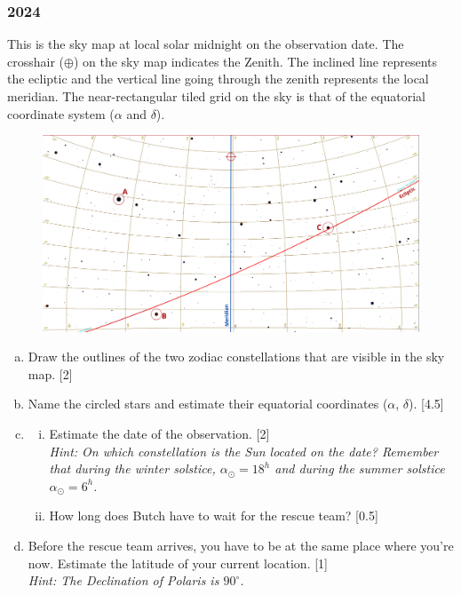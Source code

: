 \documentclass[a4paper,12pt]{extarticle}
\begin{document}
\subsubsection{2024}

This is the sky map at local solar midnight on the observation date. The crosshair ($\oplus$) on the sky map indicates the Zenith. The inclined line represents the ecliptic and the vertical line going through the zenith represents the local meridian. The near-rectangular tiled grid on the sky is that of the equatorial coordinate system ($\alpha$ and $\delta$).

\begin{figure}[htpb]
	\centering
	\includegraphics[width=.99\textwidth]{Obs_Sr24.png}
\end{figure}

\begin{enumerate}[(a)]
	\item Draw the outlines of the two zodiac constellations that are visible in the sky map. \hfill[2]
	\item Name the circled stars and estimate their equatorial coordinates ($\alpha$, $\delta$). \hfill[4.5]
	\item 
	\begin{enumerate}[(i)]
		\item Estimate the date of the observation. \hfill[2]\\
		\textit{Hint: On which constellation is the Sun located on the date? Remember that during the winter solstice, $\alpha_\odot = 18^h$ and during the summer solstice $\alpha_\odot = 6^h$.}
		\item How long does Butch have to wait for the rescue team? \hfill[0.5]
	\end{enumerate}
	\item Before the rescue team arrives, you have to be at the same place where you're now. Estimate the latitude of your current location. \hfill[1]\\
	\textit{Hint: The Declination of Polaris is $90^\circ$.}
\end{enumerate}
\end{document}
